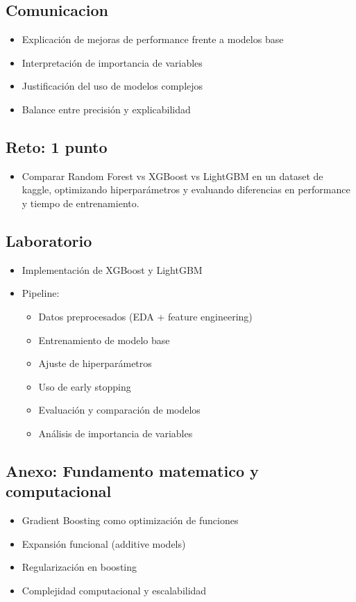 \documentclass[12pt,a4paper,openany,oneside]{book}
\begin{document}
\begin{itemize}
\subsection{Comunicacion}
\begin{itemize}
    \item Explicación de mejoras de performance frente a modelos base
    \item Interpretación de importancia de variables
    \item Justificación del uso de modelos complejos
    \item Balance entre precisión y explicabilidad
\end{itemize}

\subsection{Reto: 1 punto}
\begin{itemize}
    \item Comparar Random Forest vs XGBoost vs LightGBM en un dataset de kaggle, optimizando hiperparámetros y evaluando diferencias en performance y tiempo de entrenamiento.
\end{itemize}

\subsection{Laboratorio}
\begin{itemize}
    \item Implementación de XGBoost y LightGBM
    \item Pipeline:
    \begin{itemize}
        \item Datos preprocesados (EDA + feature engineering)
        \item Entrenamiento de modelo base
        \item Ajuste de hiperparámetros
        \item Uso de early stopping
        \item Evaluación y comparación de modelos
        \item Análisis de importancia de variables
    \end{itemize}
\end{itemize}

\subsection{Anexo: Fundamento matematico y computacional}
\begin{itemize}
    \item Gradient Boosting como optimización de funciones
    \item Expansión funcional (additive models)
    \item Regularización en boosting
    \item Complejidad computacional y escalabilidad
\end{itemize}


\end{itemize}
\end{document}
